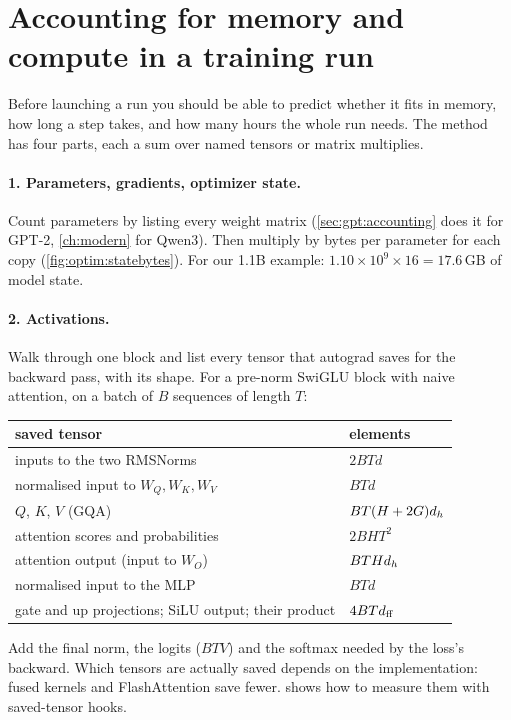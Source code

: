 \section{Accounting for memory and compute in a training run}\label{sec:optim:account}

Before launching a run you should be able to predict whether it fits in memory, how long a step
takes, and how many hours the whole run needs. The method has four parts, each a sum over
named tensors or matrix multiplies.

\paragraph{1. Parameters, gradients, optimizer state.} Count parameters by listing every
weight matrix (\cref{sec:gpt:accounting} does it for GPT-2, \cref{ch:modern} for Qwen3). Then
multiply by bytes per parameter for each copy (\cref{fig:optim:statebytes}). For our 1.1B example:
$1.10\times10^9\times16 = 17.6$\,GB of model state.

\paragraph{2. Activations.} Walk through one block and list every tensor that autograd saves
for the backward pass, with its shape. For a pre-norm SwiGLU block with naive attention, on a
batch of $B$ sequences of length $T$:
\begin{center}\small
\begin{tabular}{@{}ll@{}}
\toprule
saved tensor & elements \\
\midrule
inputs to the two RMSNorms & $2BTd$ \\
normalised input to $W_Q,W_K,W_V$ & $BTd$ \\
$Q$, $K$, $V$ (GQA) & $BT(H+2G)d_{h}$ \\
attention scores and probabilities & $2BHT^2$ \\
attention output (input to $W_O$) & $BTHd_{h}$ \\
normalised input to the MLP & $BTd$ \\
gate and up projections; SiLU output; their product & $4BTd_{\text{ff}}$ \\
\bottomrule
\end{tabular}
\end{center}
Add the final norm, the logits ($BTV$) and the softmax needed by the loss's backward. Which
tensors are actually saved depends on the implementation: fused kernels and FlashAttention save
fewer.  shows how to measure them with saved-tensor hooks.

